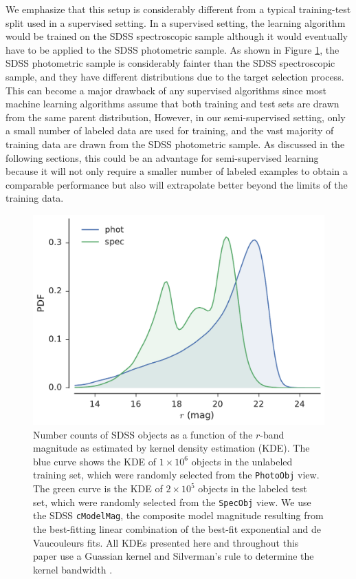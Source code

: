 \documentclass[fleqn,usenatbib]{mnras}
\begin{document}
We emphasize that this setup is considerably different from a typical training-test split used in a supervised setting.
In a supervised setting, the learning algorithm would be trained on the SDSS spectroscopic sample
although it would eventually have to be applied to the SDSS photometric sample.
As shown in Figure \ref{fig:spec_phot}, the SDSS photometric sample is considerably fainter than the SDSS spectroscopic sample,
and they have different distributions due to the target selection process.
This can become a major drawback of any supervised algorithms since most machine learning algorithms assume that both
training and test sets are drawn from the same parent distribution,
However, in our semi-supervised setting, only a small number of labeled data are used for training,
and the vast majority of training data are drawn from the SDSS photometric sample.
As discussed in the following sections, this could be an advantage for semi-supervised learning because
it will not only require a smaller number of labeled examples to obtain a comparable performance
but also will extrapolate better beyond the limits of the training data.


\begin{figure}
  \centering
  \includegraphics[width=\columnwidth]{figures/spec_phot.pdf}
  \caption{
    Number counts of SDSS objects as a function of the $r$-band magnitude as estimated by kernel density estimation (KDE).
    The blue curve shows the KDE of $1 \times 10^6$ objects in the unlabeled training set,
    which were randomly selected from the \texttt{PhotoObj} view.
    The green curve is the KDE of $2 \times 10^5$ objects in the labeled test set,
    which were randomly selected from the \texttt{SpecObj} view.
    We use the SDSS \texttt{cModelMag}, the composite model magnitude resulting from the best-fitting linear combination
    of the best-fit exponential and de Vaucouleurs fits.
    All KDEs presented here and throughout this paper use a Guassian kernel and Silverman's rule to determine
    the kernel bandwidth \citep{silverman1986density}.
  }
  \label{fig:spec_phot}
\end{figure}
\end{document}
